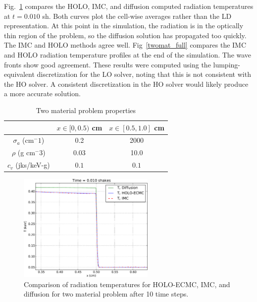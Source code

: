 \documentclass{mc2013}
\begin{document}
Fig.~\ref{twomat_quick} compares the HOLO, IMC, and diffusion computed radiation temperatures at $t=0.010$ sh.  Both curves plot the cell-wise averages rather than the LD representation.  At this point in the simulation, the radiation is in the optically thin region of the problem, so the diffusion solution has propagated too quickly.  The IMC and HOLO methods agree well.  Fig~\ref{twomat_full} compares the IMC and HOLO radiation temperature profiles at the end of the simulation.  The wave fronts show good agreement.  
These results were computed using the lumping-equivalent discretization for the LO solver, noting that this is not consistent with the HO solver.  A consistent discretization in the HO solver would likely produce a more accurate solution. 
\begin{table}[htb]
    \begin{center}
        \begin{tabular}{|c|cc|}  \cline{2-3}
            \multicolumn{1}{c|}{}   & $x \in [0,0.5)$ cm & $x \in [0.5,1.0]$ cm   \\ \hline
            $\sigma_a$ (cm$^-1$)  & 0.2 & 2000 \\
            $\rho$ (g cm$^-3$) & 0.03 & 10.0 \\
            $c_v$ (jks/keV-g) & $0.1$ & $0.1$ \\ \hline
        \end{tabular}
        \caption{Two material problem properties \label{two_mat_props}}
    \end{center}
\end{table}
\begin{figure}
\centering
    \includegraphics[width=0.59\textwidth]{twomat_holo_quick.pdf}
    \caption{Comparison of radiation temperatures for HOLO-ECMC, IMC, and diffusion for two material problem after 10 time steps. \label{twomat_quick}}
\end{figure}
\end{document}
